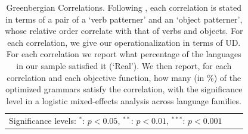 \documentclass[9pt,twocolumn,twoside,lineno]{pnas-new}
\begin{document}
\begin{table}
\begin{center}
\begin{tabular}{|ll|l|l|l|ll|l|}
    \multicolumn{6}{l}{\footnotesize{Significance levels: $^*$: $p < 0.05$, $^{**}$: $p < 0.01$, $^{***}$: $p < 0.001$}}
\end{tabular}
	\end{center}
	\caption{Greenbergian Correlations. Following \cite{dryer1992greenbergian}, each correlation is stated in terms of a pair of a `verb patterner' and an `object patterner', whose relative order correlate with that of verbs and objects.
	For each correlation, we give our operationalization in terms of UD. %
	For each correlation we report what percentage of the languages in our sample satisfied it (`Real').
	We then report, for each correlation and each objective function, how many (in \%) of the optimized grammars satisfy the correlation, with the significance level in a logistic mixed-effects analysis across language families.}\label{table:results-dryer}
\end{table}
\end{document}
